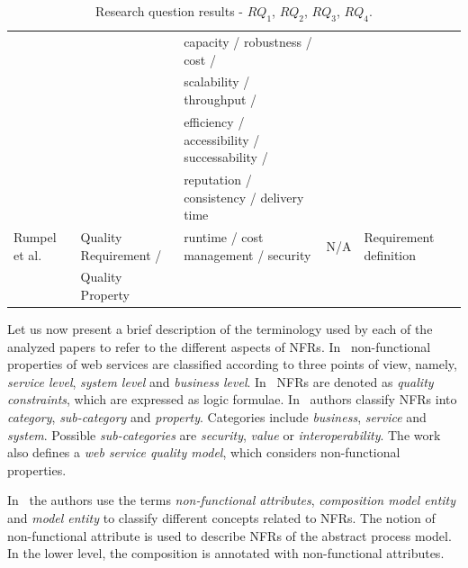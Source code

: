 \documentclass{sig-alternate}
\begin{document}
\begin{table}[ht!]
\begin{tabular}{l|l|l|c|l}
   &  & capacity / robustness / cost /   &  & 
  \\
  &  & scalability / throughput /   &  &
  \\
  &  & efficiency / accessibility / successability /   &  & 
  \\
  &  & reputation / consistency / delivery time    &  & 
  \\  
  \hline  

   Rumpel et al. \cite{Rumpel2012} & Quality Requirement /  &
  runtime / cost management / security   & N/A  &  Requirement definition 
\\
   & Quality Property  &  &   &  
  \\  
  \hline  
  \hline  
  
\end{tabular} 
\caption{Research question results - $RQ_1$, $RQ_2$, $RQ_3$, $RQ_4$.}
\label{tab:result02}
\end{table} 
 


Let us now present a brief description of the terminology used by each of the analyzed papers to refer to the different aspects of NFRs.
In~\cite{Babamir2010,Yeom2006} non-functional properties of web services are classified according to three points of view, namely,  
\textit{service level}, \textit{system level} and \textit{business level}.
In~\cite{Babamir2010} NFRs are denoted as \textit{quality constraints}, which are expressed as logic formulae.
In~\cite{Yeom2006} authors classify NFRs into \textit{category}, \textit{sub-category} and \textit{property}. Categories include \textit{business}, \textit{service} and \textit{system}.
Possible \textit{sub-categories} are \textit{security}, \textit{value} or  \textit{interoperability}. The work also defines a \textit{web service quality model}, which considers non-functional properties. 


In~\cite{XiaoCZBOLH08} the authors use the terms  
\textit{non-functional attributes}, \textit{composition mo\-del entity} and \textit{mo\-del entity}  to classify different concepts related to NFRs.
The notion of non-functional attribute is used to describe NFRs of the abstract process model. In the lower level, the composition is annotated with non-functional attributes.
\end{document}
